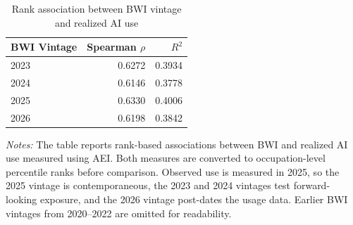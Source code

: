 \begin{table}[htbp]\centering
\caption{Rank association between BWI vintage and realized AI use}\label{tab:rankassoc}
\begin{tabular}{lrr}\toprule
BWI Vintage & Spearman $\rho$ & $R^2$ \\ \midrule
2023 & 0.6272 & 0.3934 \\
2024 & 0.6146 & 0.3778 \\
2025 & 0.6330 & 0.4006 \\
2026 & 0.6198 & 0.3842 \\
\bottomrule\end{tabular}
\begin{minipage}{0.95\linewidth}\footnotesize \textit{Notes:} The table reports rank-based associations between BWI and realized AI use measured using AEI. Both measures are converted to occupation-level percentile ranks before comparison. Observed use is measured in 2025, so the 2025 vintage is contemporaneous, the 2023 and 2024 vintages test forward-looking exposure, and the 2026 vintage post-dates the usage data. Earlier BWI vintages from 2020--2022 are omitted for readability.\end{minipage}
\end{table}
